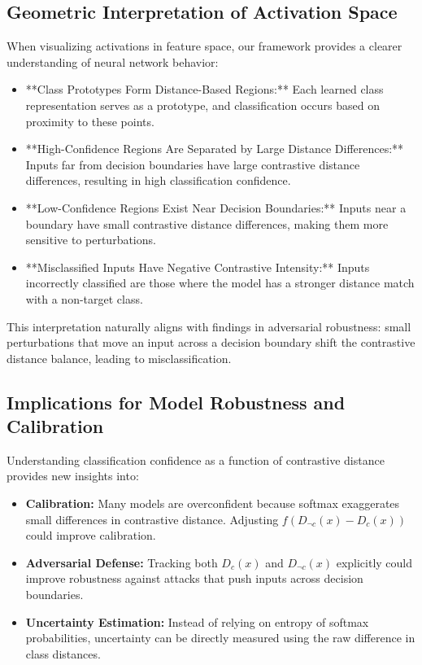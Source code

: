 \subsection{Geometric Interpretation of Activation Space}

When visualizing activations in feature space, our framework provides a clearer understanding of neural network behavior:

\begin{itemize}
    \item **Class Prototypes Form Distance-Based Regions:** Each learned class representation serves as a prototype, and classification occurs based on proximity to these points.
    \item **High-Confidence Regions Are Separated by Large Distance Differences:** Inputs far from decision boundaries have large contrastive distance differences, resulting in high classification confidence.
    \item **Low-Confidence Regions Exist Near Decision Boundaries:** Inputs near a boundary have small contrastive distance differences, making them more sensitive to perturbations.
    \item **Misclassified Inputs Have Negative Contrastive Intensity:** Inputs incorrectly classified are those where the model has a stronger distance match with a non-target class.
\end{itemize}

This interpretation naturally aligns with findings in adversarial robustness: small perturbations that move an input across a decision boundary shift the contrastive distance balance, leading to misclassification.

\subsection{Implications for Model Robustness and Calibration}

Understanding classification confidence as a function of contrastive distance provides new insights into:

\begin{itemize}
    \item \textbf{Calibration:} Many models are overconfident because softmax exaggerates small differences in contrastive distance. Adjusting \( f(D_{\neg c}(x) - D_c(x)) \) could improve calibration.
    \item \textbf{Adversarial Defense:} Tracking both \( D_c(x) \) and \( D_{\neg c}(x) \) explicitly could improve robustness against attacks that push inputs across decision boundaries.
    \item \textbf{Uncertainty Estimation:} Instead of relying on entropy of softmax probabilities, uncertainty can be directly measured using the raw difference in class distances.
\end{itemize}

